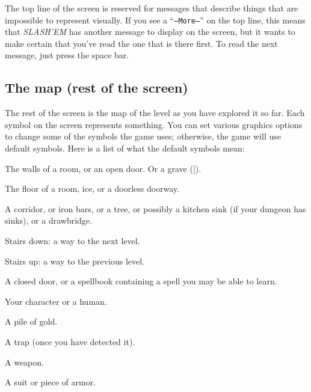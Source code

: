 
The top line of the screen is reserved for messages that describe
things that are impossible to represent visually.  If you see a
``{\tt --More--}'' on the top line, this means that {\it SLASH'EM\/} has
another message to display on the screen, but it wants to make certain
that you've read the one that is there first.  To read the next message,
just press the space bar.
\subsection*{The map (rest of the screen)}


The rest of the screen is the map of the level as you have explored it
so far.  Each symbol on the screen represents something.  You can set
various graphics options to change some of the symbols the game uses;
otherwise, the game will use default symbols.  Here is a list of what the
default symbols mean:
\blist{}

\item[\tb{- {\rm and} |}]
The walls of a room, or an open door.  Or a grave (|).

\item[\tb{.}]
The floor of a room, ice, or a doorless doorway.

\item[\tb{\#}]
A corridor, or iron bars, or a tree, or possibly a kitchen sink (if
your dungeon has sinks), or a drawbridge.

\item[\tb{>}]
Stairs down: a way to the next level.

\item[\tb{<}]
Stairs up: a way to the previous level.

\item[\tb{+}]
A closed door, or a spellbook containing a spell you may be able to learn.

\item[\tb{@}]
Your character or a human.

\item[\tb{\$}]
A pile of gold.

\item[\tb{\^{}}]
A trap (once you have detected it).

\item[\tb{)}]
A weapon.

\item[\tb{[}]
A suit or piece of armor.

